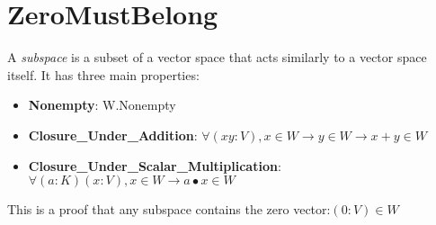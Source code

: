 \section{ZeroMustBelong}


\begin{definition}
  \label{definition : Subspace}
  \leanok
  A \emph{subspace} is a subset of a vector space that acts similarly to a vector space itself. It has three main properties:
  \begin{itemize}
    \item \textbf{Nonempty}:
    W.Nonempty
    \item \textbf{Closure\_Under\_Addition}:
    $\forall (x y : V), x ∈ W \rightarrow y \in W \rightarrow x + y \in W$
    \item \textbf{Closure\_Under\_Scalar\_Multiplication}:
    $\forall (a : K) (x : V), x \in W \rightarrow a \bullet x \in W$
  \end{itemize}
\end{definition}

\begin{theorem}
  \label{theorem : subspace_contains_zero}
  \leanok
  This is a proof that any subspace contains the zero vector:$(0 : V) \in W$
\end{theorem}